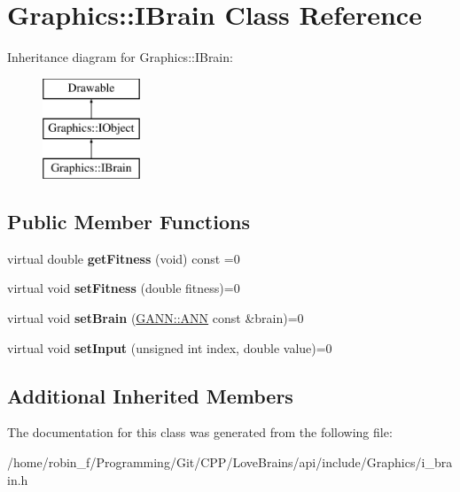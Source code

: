 \hypertarget{class_graphics_1_1_i_brain}{}\section{Graphics\+:\+:I\+Brain Class Reference}
\label{class_graphics_1_1_i_brain}
Inheritance diagram for Graphics\+:\+:I\+Brain\+:\begin{figure}[H]
\begin{center}
\leavevmode
\includegraphics[height=3.000000cm]{class_graphics_1_1_i_brain}
\end{center}
\end{figure}
\subsection*{Public Member Functions}
\begin{DoxyCompactItemize}
\item 
\hypertarget{class_graphics_1_1_i_brain_a45403eb25f611290de9c53eaf7f6e800}{}virtual double {\bfseries get\+Fitness} (void) const  =0\label{class_graphics_1_1_i_brain_a45403eb25f611290de9c53eaf7f6e800}

\item 
\hypertarget{class_graphics_1_1_i_brain_a1fdec2222c5a04a93c6918ed1f271947}{}virtual void {\bfseries set\+Fitness} (double fitness)=0\label{class_graphics_1_1_i_brain_a1fdec2222c5a04a93c6918ed1f271947}

\item 
\hypertarget{class_graphics_1_1_i_brain_a56c5f2f1f998551b571442b0225986e7}{}virtual void {\bfseries set\+Brain} (\hyperlink{class_g_a_n_n_1_1_a_n_n}{G\+A\+N\+N\+::\+A\+N\+N} const \&brain)=0\label{class_graphics_1_1_i_brain_a56c5f2f1f998551b571442b0225986e7}

\item 
\hypertarget{class_graphics_1_1_i_brain_a768f7a2e586cafbbc7c4c2ae846a52be}{}virtual void {\bfseries set\+Input} (unsigned int index, double value)=0\label{class_graphics_1_1_i_brain_a768f7a2e586cafbbc7c4c2ae846a52be}

\end{DoxyCompactItemize}
\subsection*{Additional Inherited Members}


The documentation for this class was generated from the following file\+:\begin{DoxyCompactItemize}
\item 
/home/robin\+\_\+f/\+Programming/\+Git/\+C\+P\+P/\+Love\+Brains/api/include/\+Graphics/i\+\_\+brain.\+h\end{DoxyCompactItemize}
